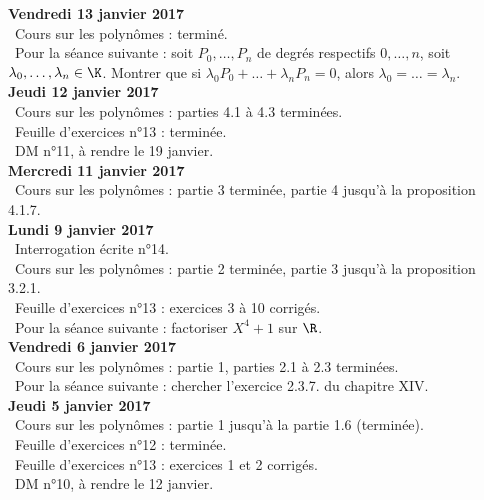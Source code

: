 \documentclass[12pt,a4paper]{article}
\begin{document}
\noindent\textbf{Vendredi 13 janvier 2017}\\
\bu\ Cours sur les polynômes : terminé.\\
\bu\ Pour la séance suivante : soit $P_0,\dots,P_n$ de degrés respectifs $0,\dots,n$, soit $\lambda_0,\dots,\lambda_n \in \K$. Montrer que si $\lambda_0 P_0 + \dots + \lambda_nP_n = 0$, alors $\lambda_0 = \dots = \lambda_n$. \vspace{.4cm}\\


\noindent\textbf{Jeudi 12 janvier 2017}\\
\bu\ Cours sur les polynômes : parties 4.1 à 4.3 terminées.\\
\bu\ Feuille d'exercices n°13 : terminée.\\
\bu\ DM n°11, à rendre le 19 janvier.\vspace{.4cm}\\

\noindent\textbf{Mercredi 11 janvier 2017}\\
\bu\ Cours sur les polynômes : partie 3 terminée, partie 4 jusqu'à la proposition 4.1.7.\vspace{.4cm}\\

\noindent\textbf{Lundi 9 janvier 2017}\\
\bu\ Interrogation écrite n°14.\\
\bu\ Cours sur les polynômes : partie 2 terminée, partie 3 jusqu'à la proposition 3.2.1.\\
\bu\ Feuille d'exercices n°13 : exercices 3 à 10 corrigés.\\
\bu\ Pour la séance suivante : factoriser $X^4+1$ sur $\R$.\vspace{.4cm}\\

\noindent\textbf{Vendredi 6 janvier 2017}\\
\bu\ Cours sur les polynômes : partie 1, parties 2.1 à 2.3 terminées.\\
\bu\ Pour la séance suivante : chercher l'exercice 2.3.7. du chapitre XIV.\vspace{.4cm}\\

\noindent\textbf{Jeudi 5 janvier 2017}\\
\bu\ Cours sur les polynômes : partie  1 jusqu'à la partie 1.6 (terminée).\\
\bu\ Feuille d'exercices n°12 : terminée.\\
\bu\ Feuille d'exercices n°13 : exercices 1 et 2 corrigés.\\
\bu\ DM n°10, à rendre le 12 janvier.\vspace{.4cm}\\
\end{document}
